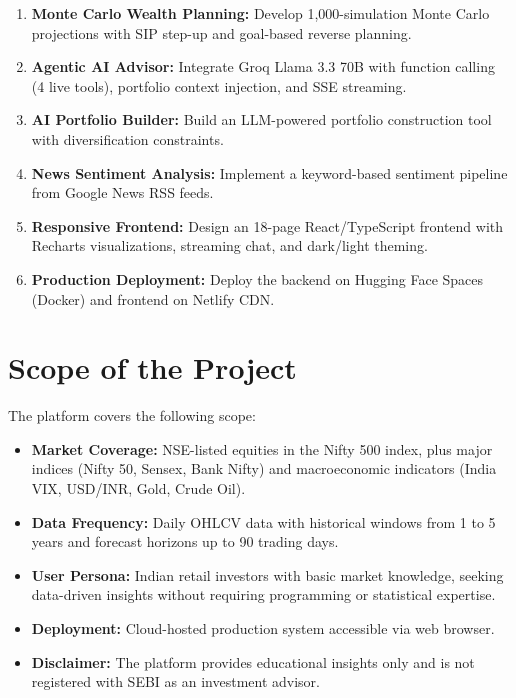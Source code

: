 \documentclass[12pt, a4paper, oneside]{report}
\begin{document}
\begin{enumerate}[nosep]
    \item \textbf{Monte Carlo Wealth Planning:} Develop 1,000-simulation Monte Carlo projections with SIP step-up and goal-based reverse planning.

    \item \textbf{Agentic AI Advisor:} Integrate Groq Llama 3.3 70B with function calling (4 live tools), portfolio context injection, and SSE streaming.

    \item \textbf{AI Portfolio Builder:} Build an LLM-powered portfolio construction tool with diversification constraints.

    \item \textbf{News Sentiment Analysis:} Implement a keyword-based sentiment pipeline from Google News RSS feeds.

    \item \textbf{Responsive Frontend:} Design an 18-page React/TypeScript frontend with Recharts visualizations, streaming chat, and dark/light theming.

    \item \textbf{Production Deployment:} Deploy the backend on Hugging Face Spaces (Docker) and frontend on Netlify CDN.
\end{enumerate}

\section{Scope of the Project}
\label{sec:scope}

The platform covers the following scope:

\begin{itemize}[nosep]
    \item \textbf{Market Coverage:} NSE-listed equities in the Nifty 500 index, plus major indices (Nifty 50, Sensex, Bank Nifty) and macroeconomic indicators (India VIX, USD/INR, Gold, Crude Oil).
    \item \textbf{Data Frequency:} Daily OHLCV data with historical windows from 1 to 5 years and forecast horizons up to 90 trading days.
    \item \textbf{User Persona:} Indian retail investors with basic market knowledge, seeking data-driven insights without requiring programming or statistical expertise.
    \item \textbf{Deployment:} Cloud-hosted production system accessible via web browser.
    \item \textbf{Disclaimer:} The platform provides educational insights only and is not registered with SEBI as an investment advisor.
\end{itemize}
\end{document}
